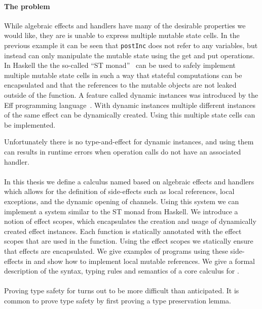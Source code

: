 \paragraph{The problem}
While algebraic effects and handlers have many of the desirable properties we would like, they are is unable to express multiple mutable state cells.
In the previous example it can be seen that \texttt{postInc} does not refer to any variables, but instead can only manipulate the mutable state using the get and put operations.
In Haskell the the so-called ``ST monad''~\autocite{runst} can be used to safely implement multiple mutable state cells in such a way that stateful computations can be encapsulated and that the references to the mutable objects are not leaked outside of the function. 
A feature called dynamic instances was introduced by the Eff programming language~\autocite{eff1}.
With dynamic instances multiple different instances of the same effect can be dynamically created.
Using this multiple state cells can be implemented.
\iffalse
Eff also introduced a construct called \emph{resources}.
Resources are an effect instance with a globally scoped handler associated.
Having a globally scoped handler means operation calls on an instance with a resource can never escape their scope and will always be handled.
\fi
Unfortunately there is no type-and-effect for dynamic instances, and using them can results in runtime errors when operation calls do not have an associated handler.
\\\\
In this thesis we define a calculus named \lang{} based on algebraic effects and handlers which allows for the definition of side-effects such as local references, local exceptions, and the dynamic opening of channels.
Using this system we can implement a system similar to the ST monad from Haskell.
We introduce a notion of effect scopes, which encapsulates the creation and usage of dynamically created effect instances.
Each function is statically annotated with the effect scopes that are used in the function.
Using the effect scopes we statically ensure that effects are encapsulated.
We give examples of programs using these side-effects in \lang{} and show how to implement local mutable references.
We give a formal description of the syntax, typing rules and semantics of a core calculus for \lang{}.
\\\\
Proving type safety for \lang{} turns out to be more difficult than anticipated.
It is common to prove type safety by first proving a type preservation lemma.
